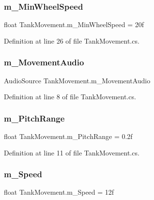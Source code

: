 \subsubsection{\texorpdfstring{m\+\_\+\+Min\+Wheel\+Speed}{m\_MinWheelSpeed}}
{\footnotesize\ttfamily float Tank\+Movement.\+m\+\_\+\+Min\+Wheel\+Speed = 20f}



Definition at line 26 of file Tank\+Movement.\+cs.

\mbox{\label{class_tank_movement_adeb10deeb3d19a4e09a373009472d30d}} 
\subsubsection{\texorpdfstring{m\+\_\+\+Movement\+Audio}{m\_MovementAudio}}
{\footnotesize\ttfamily Audio\+Source Tank\+Movement.\+m\+\_\+\+Movement\+Audio}



Definition at line 8 of file Tank\+Movement.\+cs.

\mbox{\label{class_tank_movement_ac40fed4b4da6dfb71113b1fe0061c251}} 
\subsubsection{\texorpdfstring{m\+\_\+\+Pitch\+Range}{m\_PitchRange}}
{\footnotesize\ttfamily float Tank\+Movement.\+m\+\_\+\+Pitch\+Range = 0.\+2f}



Definition at line 11 of file Tank\+Movement.\+cs.

\mbox{\label{class_tank_movement_a946b8dddff1ced5a2bc6e2c81734c9a9}} 
\subsubsection{\texorpdfstring{m\+\_\+\+Speed}{m\_Speed}}
{\footnotesize\ttfamily float Tank\+Movement.\+m\+\_\+\+Speed = 12f}




